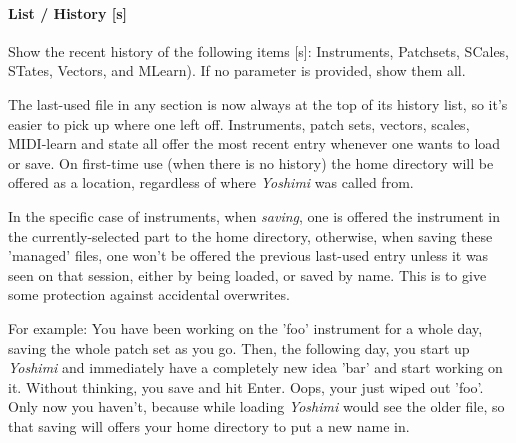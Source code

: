 %
%
%

\paragraph{List / History [s]}
\label{paragraph:command_line_list_history}

   Show the recent history of the following items [s]:
   Instruments, Patchsets, SCales, STates, Vectors, and MLearn).
   If no parameter is provided, show them all.

   The last-used file in any section is now always at the top of its history list,
   so it's easier to pick up where one left off.
   Instruments, patch sets, vectors, scales, MIDI-learn and state all offer the
   most recent entry whenever one wants to load or save.  On first-time use (when
   there is no history) the home directory will be offered as a location,
   regardless of where \textsl{Yoshimi} was called from.

   In the specific case of instruments, when \textsl{saving},
   one is offered the instrument in the currently-selected part to the home
   directory, otherwise, when saving these 'managed' files,
   one won't be offered the previous last-used entry unless it was seen on that
   session, either by being loaded, or saved by name. This is to give some
   protection against accidental overwrites.

   For example:
   You have been working on the 'foo' instrument
   for a whole day, saving the whole patch set as you
   go. Then, the following day, you start up \textsl{Yoshimi}
   and immediately have a completely
   new idea 'bar' and start working on it. Without thinking, you save and hit
   Enter. Oops, your just wiped out 'foo'.
   Only now you haven't, because while loading \textsl{Yoshimi}
   would see the older file, so that saving
   will offers your home directory to put a new name in.

